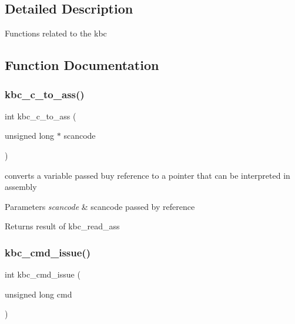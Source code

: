 \subsection{Detailed Description}
Functions related to the kbc 

\subsection{Function Documentation}
\hypertarget{group__kbc_gac76f743c998918d5ff65403aa35c8b05}{}\label{group__kbc_gac76f743c998918d5ff65403aa35c8b05} 
\subsubsection{\texorpdfstring{kbc\+\_\+c\+\_\+to\+\_\+ass()}{kbc\_c\_to\_ass()}}
{\footnotesize\ttfamily int kbc\+\_\+c\+\_\+to\+\_\+ass (\begin{DoxyParamCaption}\item[{unsigned long $\ast$}]{scancode }\end{DoxyParamCaption})}



converts a variable passed buy reference to a pointer that can be interpreted in assembly 


\begin{DoxyParams}{Parameters}
{\em scancode} & scancode passed by reference \\
\hline
\end{DoxyParams}
\begin{DoxyReturn}{Returns}
result of kbc\+\_\+read\+\_\+ass 
\end{DoxyReturn}
\hypertarget{group__kbc_ga54b191a4ae0a5ed8d23e31cd50eb4868}{}\label{group__kbc_ga54b191a4ae0a5ed8d23e31cd50eb4868} 
\subsubsection{\texorpdfstring{kbc\+\_\+cmd\+\_\+issue()}{kbc\_cmd\_issue()}}
{\footnotesize\ttfamily int kbc\+\_\+cmd\+\_\+issue (\begin{DoxyParamCaption}\item[{unsigned long}]{cmd }\end{DoxyParamCaption})}



